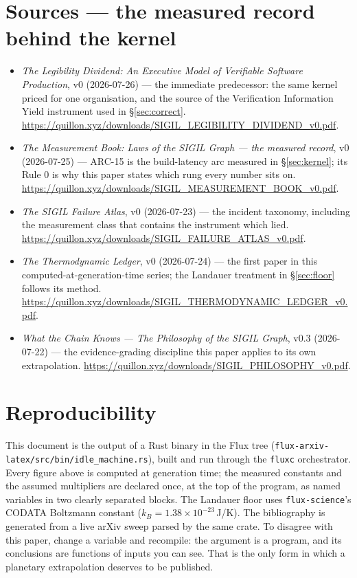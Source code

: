 \documentclass[11pt,a4paper]{article}
\begin{document}
\section*{Sources --- the measured record behind the kernel}
\label{sec:sources}
\small
\begin{itemize}[leftmargin=1.2em,itemsep=1pt]
\item \emph{The Legibility Dividend: An Executive Model of Verifiable Software Production}, v0 (2026-07-26) --- the immediate predecessor: the same kernel priced for one organisation, and the source of the Verification Information Yield instrument used in \S\ref{sec:correct}. \url{https://quillon.xyz/downloads/SIGIL_LEGIBILITY_DIVIDEND_v0.pdf}.
\item \emph{The Measurement Book: Laws of the SIGIL Graph --- the measured record}, v0 (2026-07-25) --- ARC-15 is the build-latency arc measured in \S\ref{sec:kernel}; its Rule 0 is why this paper states which rung every number sits on. \url{https://quillon.xyz/downloads/SIGIL_MEASUREMENT_BOOK_v0.pdf}.
\item \emph{The SIGIL Failure Atlas}, v0 (2026-07-23) --- the incident taxonomy, including the measurement class that contains the instrument which lied. \url{https://quillon.xyz/downloads/SIGIL_FAILURE_ATLAS_v0.pdf}.
\item \emph{The Thermodynamic Ledger}, v0 (2026-07-24) --- the first paper in this computed-at-generation-time series; the Landauer treatment in \S\ref{sec:floor} follows its method. \url{https://quillon.xyz/downloads/SIGIL_THERMODYNAMIC_LEDGER_v0.pdf}.
\item \emph{What the Chain Knows --- The Philosophy of the SIGIL Graph}, v0.3 (2026-07-22) --- the evidence-grading discipline this paper applies to its own extrapolation. \url{https://quillon.xyz/downloads/SIGIL_PHILOSOPHY_v0.pdf}.
\end{itemize}


\section{Reproducibility}
This document is the output of a Rust binary in the Flux tree (\texttt{flux-arxiv-latex/}\allowbreak\texttt{src/bin/}\allowbreak\texttt{idle\_machine.rs}), built and run through the \texttt{fluxc} orchestrator. Every figure above is computed at generation time; the measured constants and the assumed multipliers are declared once, at the top of the program, as named variables in two clearly separated blocks. The Landauer floor uses \texttt{flux-science}'s CODATA Boltzmann constant ($k_B=1.38\times10^{-23}$\,J/K). The bibliography is generated from a live arXiv sweep parsed by the same crate. To disagree with this paper, change a variable and recompile: the argument is a program, and its conclusions are functions of inputs you can see. That is the only form in which a planetary extrapolation deserves to be published.
\end{document}

